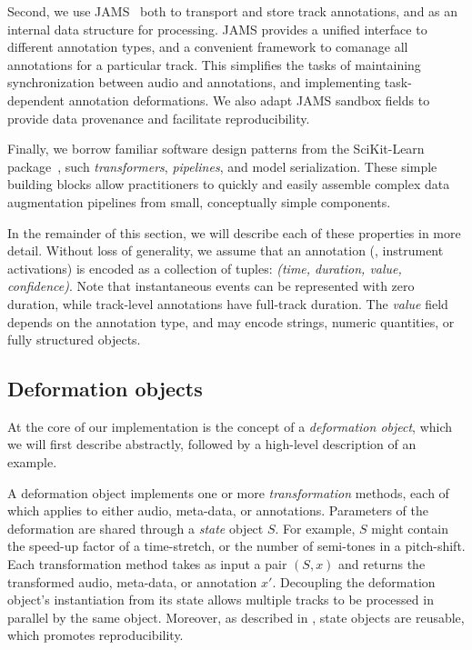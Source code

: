 \documentclass{article}
\begin{document}
Second, we use JAMS~\cite{humphreyjams} both to transport and store track annotations, 
and as an internal data structure for processing.
JAMS provides a unified interface to different annotation types, and a convenient framework to comanage all annotations
for a particular track.
This simplifies the tasks of maintaining synchronization between audio and annotations,
and implementing task-dependent annotation deformations.  
We also adapt JAMS sandbox fields to provide data provenance and facilitate reproducibility.

%
Finally, we borrow familiar software design patterns from the SciKit-Learn
package~\cite{buitinck2013api}, such \emph{transformers}, \emph{pipelines}, 
and model serialization.  These simple building blocks allow
practitioners to quickly and easily assemble complex data augmentation pipelines 
from small, conceptually simple components.


In the remainder of this section, we will describe each of these
properties in more detail.  Without loss of generality, we assume that an
annotation (\eg, instrument activations) is encoded as a collection of
tuples: \emph{(time, duration, value, confidence)}.
Note that instantaneous events can be represented with zero duration, while
track-level annotations have full-track duration.  The \emph{value} field depends on
the annotation type, and may encode strings, numeric quantities, or fully structured
objects.

\subsection{Deformation objects}

At the core of our implementation is the concept of a \emph{deformation object}, which we will 
first describe abstractly, followed by a high-level description of an example.

A deformation object implements one or more \emph{transformation} methods, each of which
applies to either audio, meta-data, or annotations.
Parameters of the deformation are shared through a \emph{state} object $S$.
For example, $S$ might contain the speed-up factor of a
time-stretch, or the number of semi-tones in a pitch-shift.  
Each transformation method takes as input a pair $(S, x)$ and
returns the transformed audio, meta-data, or annotation $x'$.
Decoupling the deformation object's instantiation from
its state allows multiple tracks to be processed in parallel by the same object.
Moreover, as described in , 
state objects are reusable, which promotes reproducibility.
\end{document}

